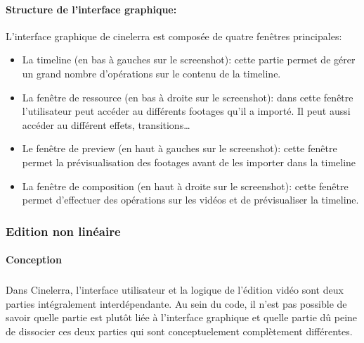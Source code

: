 \paragraph{Structure de l'interface graphique:}

L'interface graphique de cinelerra est composée de quatre fenêtres
principales:

\begin{itemize}
  \item {La timeline (en bas à gauches sur le screenshot): cette
    partie permet de gérer un grand nombre d'opérations sur le contenu
    de la timeline.}

  \item {La fenêtre de ressource (en bas à droite sur le screenshot):
    dans cette fenêtre l'utilisateur peut accéder au différents
    footages qu'il a importé. Il peut aussi accéder au différent
    effets, transitions\ldots}

  \item {Le fenêtre de preview (en haut à gauches sur le screenshot):
    cette fenêtre permet la prévisualisation des footages avant de
    les importer dans la timeline}

  \item {La fenêtre de composition (en haut à droite sur le screenshot):
    cette fenêtre permet d'effectuer des opérations sur les vidéos
    et de prévisualiser la timeline.}

\end{itemize}

\subsubsection{Edition non linéaire}

\paragraph{Conception}

\subparagraph{}

Dans Cinelerra, l'interface utilisateur et la logique de l'édition
vidéo sont deux parties intégralement interdépendante. Au sein du
code, il n'est pas possible de savoir quelle partie est plutôt liée à
l'interface graphique et quelle partie %
dû %
peine de dissocier ces deux parties qui sont conceptuelement complètement
différentes. %


